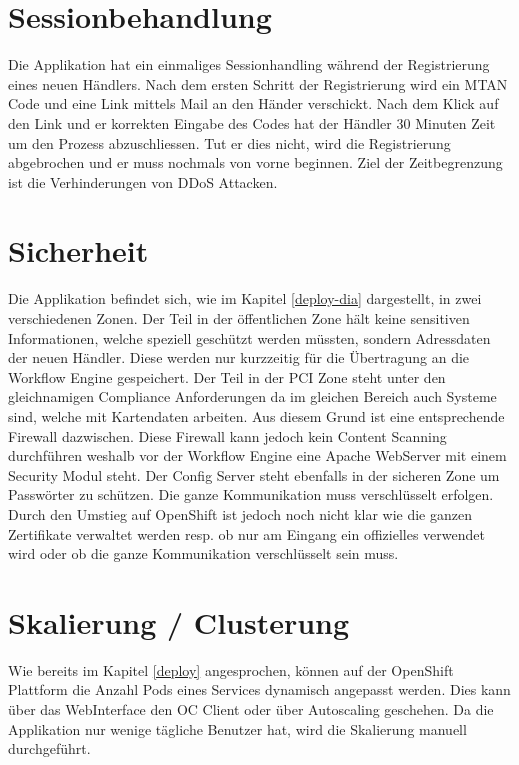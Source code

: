 \section{Sessionbehandlung}

Die Applikation hat ein einmaliges Sessionhandling während der Registrierung eines neuen Händlers. Nach dem ersten Schritt der Registrierung wird ein MTAN Code und eine Link mittels Mail an den Händer verschickt. Nach dem Klick auf den Link und er korrekten Eingabe des Codes hat der Händler 30 Minuten Zeit um den Prozess abzuschliessen.
Tut er dies nicht, wird die Registrierung abgebrochen und er muss nochmals von vorne beginnen. Ziel der Zeitbegrenzung ist die Verhinderungen von \Gls{DDoS} Attacken.

\section{Sicherheit}

Die Applikation befindet sich, wie im Kapitel \ref{deploy-dia} dargestellt, in zwei verschiedenen Zonen. Der Teil in der öffentlichen Zone hält keine sensitiven Informationen, welche speziell geschützt werden müssten, sondern Adressdaten der neuen Händler. Diese werden nur kurzzeitig für die Übertragung an die Workflow Engine gespeichert. Der Teil in der PCI Zone steht unter den gleichnamigen Compliance Anforderungen da im gleichen Bereich auch Systeme sind, welche mit Kartendaten arbeiten. Aus diesem Grund ist eine entsprechende Firewall dazwischen. Diese Firewall kann jedoch kein Content Scanning durchführen weshalb vor der Workflow Engine eine Apache WebServer mit einem Security Modul steht. Der Config Server steht ebenfalls in der sicheren Zone um Passwörter zu schützen. Die ganze Kommunikation muss verschlüsselt erfolgen. Durch den Umstieg auf OpenShift ist jedoch noch nicht klar wie die ganzen Zertifikate verwaltet werden resp. ob nur am Eingang ein offizielles verwendet wird oder ob die ganze Kommunikation verschlüsselt sein muss.

\section{Skalierung / Clusterung}

Wie bereits im Kapitel \ref{deploy} angesprochen, können auf der OpenShift Plattform die Anzahl Pods eines Services dynamisch angepasst werden. Dies kann über das WebInterface den OC Client oder über Autoscaling geschehen. Da die Applikation nur wenige tägliche Benutzer hat, wird die Skalierung manuell durchgeführt.

